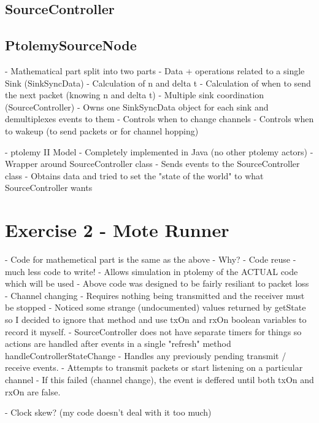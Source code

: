 \documentclass[a4paper,12pt,draft,DIV=calc]{scrartcl}
\begin{document}
\subsection{SourceController}

\subsection{PtolemySourceNode}

- Mathematical part split into two parts
  - Data + operations related to a single Sink (SinkSyncData)
    - Calculation of n and delta t
    - Calculation of when to send the next packet (knowing n and delta t)
  - Multiple sink coordination (SourceController)
    - Owns one SinkSyncData object for each sink and demultiplexes events to
      them
    - Controls when to change channels
    - Controls when to wakeup (to send packets or for channel hopping)

- ptolemy II Model
  - Completely implemented in Java (no other ptolemy actors)
  - Wrapper around SourceController class
  - Sends events to the SourceController class
  - Obtains data and tried to set the "state of the world" to what
    SourceController wants

\section{Exercise 2 - Mote Runner}
- Code for mathemetical part is the same as the above
  - Why?
    - Code reuse - much less code to write!
    - Allows simulation in ptolemy of the ACTUAL code which will be used
    - Above code was designed to be fairly resiliant to packet loss
- Channel changing
  - Requires nothing being transmitted and the receiver must be stopped
    - Noticed some strange (undocumented) values returned by getState so I
      decided to ignore that method and use txOn and rxOn boolean variables to
      record it myself.
- SourceController does not have separate timers for things so actions are
  handled after events in a single "refresh" method handleControllerStateChange
  - Handles any previously pending transmit / receive events.
  - Attempts to transmit packets or start listening on a particular channel
  - If this failed (channel change), the event is deffered until both txOn
    and rxOn are false.

- Clock skew? (my code doesn't deal with it too much)
\end{document}
